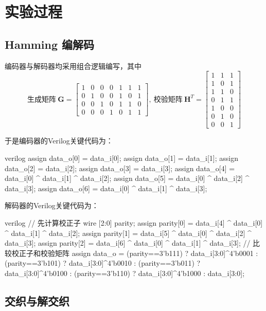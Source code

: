 \section{实验过程}

\subsection{Hamming 编解码}

编码器与解码器均采用组合逻辑编写，其中 
$$\mbox{生成矩阵}~\bm{G} = \begin{bmatrix}1 & 0 & 0 & 0 & 1 & 1 & 1\\ 0 & 1 & 0 & 0 & 1 & 0 & 1\\ 0 & 0 & 1 & 0 &1 & 1 & 0\\ 0 & 0 & 0 & 1 & 0 & 1 & 1\end{bmatrix},~ \mbox{校验矩阵}~\bm{H}^T=\begin{bmatrix}1 & 1 & 1\\ 1 & 0 & 1\\ 1 & 1 & 0\\ 0 & 1 & 1\\ 1 & 0 & 0\\ 0 & 1 & 0\\ 0 & 0 & 1\end{bmatrix}$$

于是编码器的Verilog关键代码为：

\begin{codeblock}{verilog}
assign data_o[0] = data_i[0];
assign data_o[1] = data_i[1];
assign data_o[2] = data_i[2];
assign data_o[3] = data_i[3];
assign data_o[4] = data_i[0] ^ data_i[1] ^ data_i[2];
assign data_o[5] = data_i[0] ^ data_i[2] ^ data_i[3];
assign data_o[6] = data_i[0] ^ data_i[1] ^ data_i[3];
\end{codeblock}

解码器的Verilog关键代码为：
\begin{codeblock}{verilog}
// 先计算校正子
wire [2:0] parity;
assign parity[0] = data_i[4] ^ data_i[0] ^ data_i[1] ^ data_i[2];
assign parity[1] = data_i[5] ^ data_i[0] ^ data_i[2] ^ data_i[3];
assign parity[2] = data_i[6] ^ data_i[0] ^ data_i[1] ^ data_i[3];
// 比较校正子和校验矩阵
assign data_o = (parity==3'b111) ? data_i[3:0]^4'b0001 : 
                (parity==3'b101) ? data_i[3:0]^4'b0010 :
                (parity==3'b011) ? data_i[3:0]^4'b0100 :
                (parity==3'b110) ? data_i[3:0]^4'b1000 :
                data_i[3:0];
\end{codeblock}


\subsection{交织与解交织}

